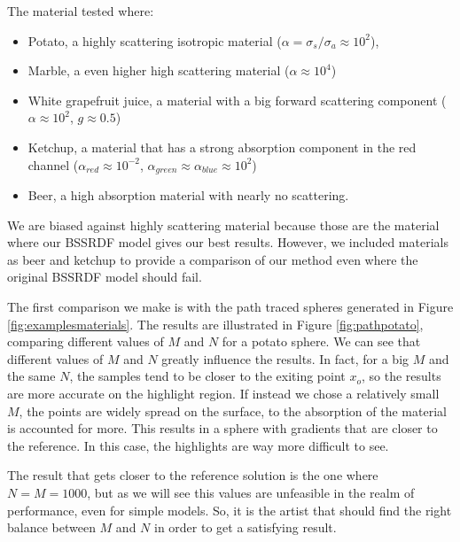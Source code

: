 The material tested where:
\begin{itemize}
	\item  Potato, a highly scattering isotropic material ($\alpha = \sigma_s / \sigma_a \approx 10^2$), 
	\item  Marble, a even higher high scattering material ($\alpha \approx 10^4$) 
	\item  White grapefruit juice, a material with a big forward scattering component ($\alpha \approx 10^2$, $g \approx 0.5$)
	\item  Ketchup, a material that has a strong absorption component in the red channel ($\alpha_{red} \approx 10^{-2}$, $\alpha_{green} \approx \alpha_{blue} \approx 10^2$)
	\item  Beer, a high absorption material with nearly no scattering.
\end{itemize}
We are biased against highly scattering material because those are the material where our BSSRDF model gives our best results. However, we included materials as beer and ketchup to provide a comparison of our method even where the original BSSRDF model should fail.

The first comparison we make is with the path traced spheres generated in Figure \ref{fig:examplesmaterials}. The results are illustrated in Figure \ref{fig:pathpotato}, comparing different values of $M$ and $N$ for a potato sphere. We can see that different values of $M$ and $N$ greatly influence the results. In fact, for a big $M$ and the same $N$, the samples tend to be closer to the exiting point $x_o$, so the results are more accurate on the highlight region. If instead we chose a relatively small $M$, the points are widely spread on the surface, to the absorption of the material is accounted for more. This results in a sphere with gradients that are closer to the reference. In this case, the highlights are way more difficult to see. 

The result that gets closer to the reference solution is the one where $N = M = 1000$, but as we will see this values are unfeasible in the realm of performance, even for simple models. So, it is the artist that should find the right balance between $M$ and $N$ in order to get a satisfying result. 

